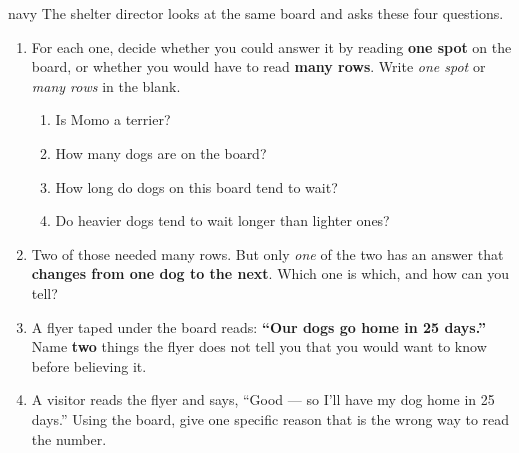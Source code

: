\boxguard[16]
\begin{scenariobox}{navy}
The shelter director looks at the same board and asks these four questions.

\begin{enumerate}[label=\textbf{\alph*.}, leftmargin=1.8em, itemsep=8pt]
  \item For each one, decide whether you could answer it by reading \textbf{one spot} on the
        board, or whether you would have to read \textbf{many rows}. Write \emph{one spot} or
        \emph{many rows} in the blank.

        \begin{enumerate}[label=\textbf{(\Alph*)}, leftmargin=2.2em, itemsep=5pt]
          \item Is Momo a terrier? \hfill \blank{3.2cm}
          \item How many dogs are on the board? \hfill \blank{3.2cm}
          \item How long do dogs on this board tend to wait? \hfill \blank{3.2cm}
          \item Do heavier dogs tend to wait longer than lighter ones? \hfill \blank{3.2cm}
        \end{enumerate}
  \item Two of those needed many rows. But only \emph{one} of the two has an answer that
        \textbf{changes from one dog to the next}. Which one is which, and how can you tell?
        \answerspace{2.6cm}{}
  \item A flyer taped under the board reads: \textbf{``Our dogs go home in 25 days.''}
        Name \textbf{two} things the flyer does not tell you that you would want to know
        before believing it.
        \answerspace{2.0cm}{}
  \item A visitor reads the flyer and says, ``Good --- so I'll have my dog home in 25 days.''
        Using the board, give one specific reason that is the wrong way to read the number.
        \answerspace{2.0cm}{}
\end{enumerate}
\end{scenariobox}

